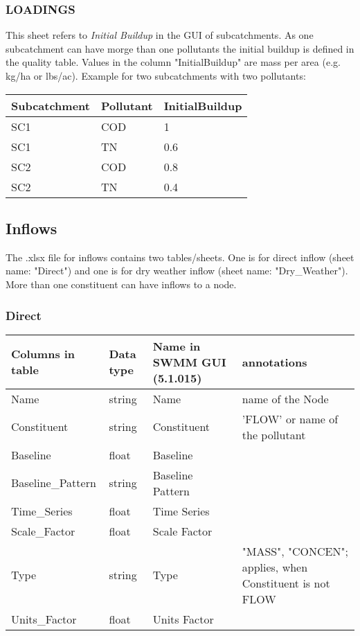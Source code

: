 \documentclass[10pt,a4paper,oneside]{scrbook}
\begin{document}
\subsubsection{LOADINGS}
This sheet refers to \textit{Initial Buildup} in the GUI of subcatchments. As one subcatchment can have morge than one pollutants the initial buildup is defined in the quality table. Values in the column "InitialBuildup" are mass per area (e.g. kg/ha or lbs/ac). Example for two subcatchments with two pollutants:\\
\begin{tabular}{|p{5cm}|p{2cm}|P{3cm}|}
\hline 
\textbf{Subcatchment} & \textbf{Pollutant} & \textbf{InitialBuildup}\\ 
\hline
SC1 & COD & 1\\
\hline
SC1 & TN & 0.6\\
\hline
SC2 & COD & 0.8\\
\hline
SC2 & TN & 0.4\\
\hline
\end{tabular}


\newpage
\subsection{Inflows}
The .xlsx file for inflows contains two tables/sheets. One is for direct inflow (sheet name: "Direct") and one is for dry weather inflow (sheet name: "Dry\_Weather"). More than one constituent can have inflows to a node. 
\subsubsection{Direct}
\begin{tabular}{p{4cm}|p{1.3cm}|P{3cm}|P{5.7cm}}
\hline 
\textbf{Columns in table} & \textbf{Data type} & \textbf{Name in SWMM GUI (5.1.015)} & \textbf{annotations}\\ 
\hline 
Name & string & Name & name of the Node\\
Constituent & string & Constituent & 'FLOW' or name of the pollutant\\ 
Baseline & float & Baseline & \\ 
Baseline\_Pattern & string & Baseline Pattern & \\ 
Time\_Series & float & Time Series & \\ 
Scale\_Factor & float & Scale Factor & \\ 
Type & string & Type & "MASS", "CONCEN"; applies, when Constituent is not FLOW\\ 
Units\_Factor & float & Units Factor & \\ 
\hline
\end{tabular}
\end{document}
